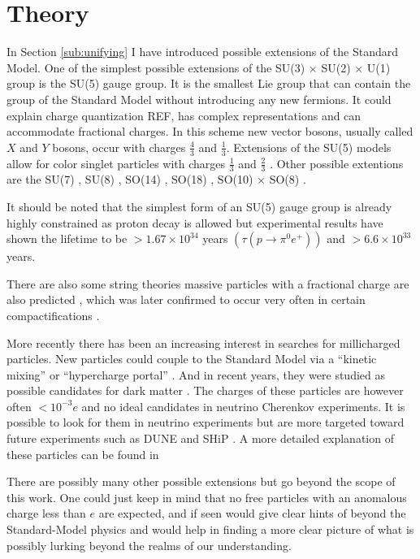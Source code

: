 \section{Theory}
In Section \ref{sub:unifying} I have introduced possible extensions of the Standard Model. One of the simplest possible extensions of the SU(3) $\times$ SU(2) $\times$ U(1) group is the SU(5) gauge group. It is the smallest Lie group that can contain the group of the Standard Model without introducing any new fermions. It could explain charge quantization REF, has complex representations and can accommodate fractional charges. In this scheme new vector bosons, usually called $X$ and $Y$ bosons, occur with charges $\frac{4}{3}$ and $\frac{1}{3}$. Extensions of the SU(5) models allow for color singlet particles with charges $\frac{1}{3}$ and $\frac{2}{3}$ \cite{Barr:1982vj}. Other possible extentions are the SU(7) \cite{Frampton:1982gc}, SU(8) \cite{Yu:1984pb}, SO(14) \cite{Yamamoto:1982sk}, SO(18) \cite{Dong:1983nh}, SO(10) $\times$ SO(8) \cite{Jiang:1985jy}. 

It should be noted that the simplest form of an SU(5) gauge group is already highly constrained as proton decay is allowed but experimental results have shown the lifetime to be $>1.67 \times 10^{34}$ years $\left(\tau\left(p \rightarrow \pi^0 e^+\right)\right)$ and $>6.6 \times 10^{33}$ years.

There are also some string theories massive particles with a fractional charge are also predicted \cite{Wen:1985qj,Antoniadis:1992eb}, which was later confirmed to occur very often in certain compactifications \cite{Athanasiu:1988uj}.

More recently there has been an increasing interest in searches for millicharged particles. New particles could couple to the Standard Model via a ``kinetic mixing'' or ``hypercharge portal'' \cite{Holdom:1985ag,Izaguirre:2015eya}. And in recent years, they were studied as possible candidates for dark matter \cite{Brahm:1989jh,Boehm:2003hm,Pospelov:2007mp,Bjorken:2009mm}. The charges of these particles are however often $<10^{-3}e$ and no ideal candidates in neutrino Cherenkov experiments. It is possible to look for them in neutrino experiments \cite{Magill:2018tbb} but are more targeted toward future experiments such as DUNE \cite{Acciarri:2015uup} and SHiP \cite{Anelli:2015pba}. A more detailed explanation of these particles can be found in \cite{Battaglieri:2017aum}

There are possibly many other possible extensions but go beyond the scope of this work. One could just keep in mind that no free particles with an anomalous charge less than $e$ are expected, and if seen would give clear hints of beyond the Standard-Model physics and would help in finding a more clear picture of what is possibly lurking beyond the realms of our understanding.



